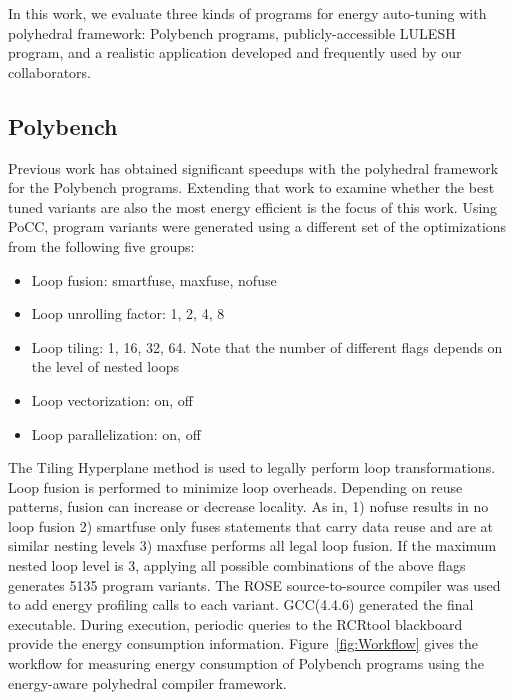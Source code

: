In this work, we evaluate three kinds of programs for energy auto-tuning with
polyhedral framework: Polybench programs, publicly-accessible LULESH 
program\cite{LULESH:versions}, and a realistic application developed and frequently 
used by our collaborators.

\subsection{Polybench}
Previous work has obtained significant speedups with the 
polyhedral framework for the Polybench programs\cite{EJ2011,EJ2012,EJ2013}.
Extending that work to examine whether the best tuned variants are also
the most energy efficient is the focus of this work.
Using PoCC, program variants were generated using
a different set of the 
optimizations from the following five groups: 
\begin{itemize}
    \item Loop fusion: smartfuse, maxfuse, nofuse
    \item Loop unrolling factor: 1, 2, 4, 8
    \item Loop tiling: 1, 16, 32, 64. Note that the number of different flags
 depends on the level of nested loops   
    \item Loop vectorization: on, off
    \item Loop parallelization: on, off
\end{itemize}
The Tiling Hyperplane method\cite{Hyperplane} is used to legally perform loop transformations.
Loop fusion is performed to minimize loop overheads. Depending on reuse patterns, fusion can increase or decrease locality. As in\cite{EJ2013}, 1) nofuse results in no loop fusion 2) smartfuse only
fuses statements that carry data reuse and are at similar nesting levels 3) maxfuse performs all legal loop fusion.
If the maximum nested loop level is 3, applying all possible combinations
of the above flags generates 5135 program variants. The ROSE source-to-source
compiler was used to add energy profiling calls to each variant.
GCC(4.4.6) generated the final executable. During execution,
 periodic queries to the RCRtool blackboard provide the energy consumption information.
Figure~\ref{fig:Workflow} gives the workflow for measuring energy consumption of 
Polybench programs using the energy-aware polyhedral compiler framework.

